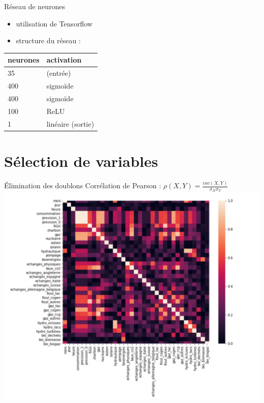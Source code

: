 \begin{frame}{Réseau de neurones}
\protect\hypertarget{ruxe9seau-de-neurones}{}
\begin{itemize}
\tightlist
\item
  utilisation de Tensorflow
\item
  structure du réseau :
\end{itemize}

\begin{longtable}[]{@{}ll@{}}
\toprule
\textbf{neurones} & \textbf{activation}\tabularnewline
\midrule
\endhead
35 & (entrée)\tabularnewline
400 & sigmoïde\tabularnewline
400 & sigmoïde\tabularnewline
100 & ReLU\tabularnewline
1 & linéaire (sortie)\tabularnewline
\bottomrule
\end{longtable}
\end{frame}

\hypertarget{suxe9lection-de-variables}{%
\section{Sélection de variables}\label{suxe9lection-de-variables}}

\begin{frame}{Élimination des doublons}
\protect\hypertarget{uxe9limination-des-doublons}{}
Corrélation de Pearson :
\(\rho(X,Y) = \frac{cov(X, Y)}{\sigma_X\sigma_Y}\)
\includegraphics[scale=.4]{figures/heatmap.jpg}
\end{frame}

